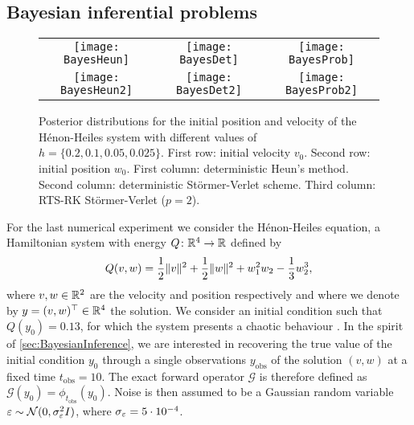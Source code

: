 \documentclass[10pt]{article}
\begin{document}
\subsection{Bayesian inferential problems}\label{sec:BayesianInferenceEx}
\begin{figure}	
	\begin{center}
		
		\vspace{0.1cm}
		\begin{tabular}{ccc}
			\hspace{-0.32cm}\texttt{[image: BayesHeun]}  & \hspace{-0.32cm}\texttt{[image: BayesDet]}  & \hspace{-0.32cm}\texttt{[image: BayesProb]} \\ 
			\texttt{[image: BayesHeun2]} & \texttt{[image: BayesDet2]} & \texttt{[image: BayesProb2]} \\
		\end{tabular}
	\end{center}
	\caption{Posterior distributions for the initial position and velocity of the Hénon-Heiles system with different values of $h = \{0.2, 0.1, 0.05, 0.025\}$. First row: initial velocity $v_0$. Second row: initial position $w_0$. First column: deterministic Heun's method. Second column: deterministic Störmer-Verlet scheme. Third column: RTS-RK Störmer-Verlet ($p=2$).}
	\label{fig:Bayes}
\end{figure}

For the last numerical experiment we consider the Hénon-Heiles equation, a Hamiltonian system with energy $Q\colon \mathbb{R}^4 \to \mathbb{R}$ defined by
\begin{equation}\label{eq:HamHH}
	Q(v, w) = \frac{1}{2}\lVert v\rVert^2 + \frac{1}{2}\lVert w\rVert^2 + w_1^2w_2 - \frac{1}{3}w_2^3,
\end{equation} 
where $v, w \in \mathbb{R}^2$ are the velocity and position respectively and where we denote by $y = (v, w)^\top \in \mathbb{R}^4$ the solution. We consider an initial condition such that $Q(y_0) = 0.13$, for which the system presents a chaotic behaviour \cite{HeH64}. In the spirit of \cref{sec:BayesianInference}, we are interested in recovering the true value of the initial condition $y_0$ through a single observations $y_{\mathrm{obs}}$ of the solution $(v, w)$ at a fixed time $t_{\mathrm{obs}} = 10$. The exact forward operator $\mathcal{G}$ is therefore defined as $\mathcal{G}(y_0) = \phi_{t_{\mathrm{obs}}}(y_0)$. Noise is then assumed to be a Gaussian random variable $\varepsilon \sim \mathcal{N}(0, \sigma_\varepsilon^2 I)$, where $\sigma_\varepsilon = 5 \cdot 10^{-4}$.
\end{document}
